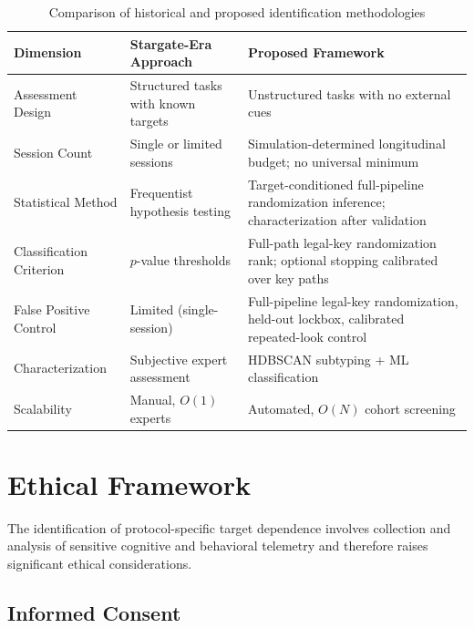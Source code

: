 \documentclass[11pt,letterpaper]{article}
\begin{document}
\begin{table}[t]
\centering
\caption{Comparison of historical and proposed identification methodologies}
\label{tab:comparison}
\begin{tabular}{@{}p{3.2cm}p{5.0cm}p{5.0cm}@{}}
\toprule
\textbf{Dimension} & \textbf{Stargate-Era Approach} & \textbf{Proposed Framework} \\
\midrule
Assessment Design & Structured tasks with known targets & Unstructured tasks with no external cues \\
Session Count & Single or limited sessions & Simulation-determined longitudinal budget; no universal minimum \\
Statistical Method & Frequentist hypothesis testing & Target-conditioned full-pipeline randomization inference; characterization after validation \\
Classification Criterion & $p$-value thresholds & Full-path legal-key randomization rank; optional stopping calibrated over key paths \\
False Positive Control & Limited (single-session) & Full-pipeline legal-key randomization, held-out lockbox, calibrated repeated-look control \\
Characterization & Subjective expert assessment & HDBSCAN subtyping + ML classification \\
Scalability & Manual, $O(1)$ experts & Automated, $O(N)$ cohort screening \\
\bottomrule
\end{tabular}
\end{table}

\section{Ethical Framework}
\label{sec:ethics}

The identification of protocol-specific target dependence involves collection and analysis of sensitive cognitive and behavioral telemetry and therefore raises significant ethical considerations.

\subsection{Informed Consent}
\end{document}
